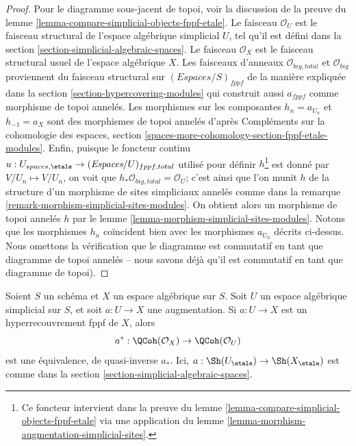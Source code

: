 \begin{proof}
Pour le diagramme sous-jacent de topoi, voir la discussion de
la preuve du lemme \ref{lemma-compare-simplicial-objects-fppf-etale}.
Le faisceau $\mathcal{O}_U$ est le faisceau structural de l'espace algébrique simplicial
$U$, tel qu'il est défini dans la section
\ref{section-simplicial-algebraic-spaces}.
Le faisceau $\mathcal{O}_X$ est le faisceau structural usuel de l'espace algébrique
$X$. Les faisceaux d'anneaux $\mathcal{O}_{big, total}$ et
$\mathcal{O}_{big}$ proviennent du faisceau structural sur
$(\textit{Espaces}/S)_{fppf}$ de la manière expliquée dans la section
\ref{section-hypercovering-modules}
qui construit aussi $a_{fppf}$ comme morphisme de topoi annelés.
Les morphismes sur les composantes $h_n = a_{U_n}$ et $h_{-1} = a_X$
sont des morphismes de topoi annelés d'après
Compléments sur la cohomologie des espaces, section
\ref{spaces-more-cohomology-section-fppf-etale-modules}.
Enfin, puisque le foncteur continu
$u : U_{spaces, \etale} \to (\textit{Espaces}/U)_{fppf, total}$
utilisé pour définir $h$\footnote{Ce foncteur intervient dans la preuve du
lemme \ref{lemma-compare-simplicial-objects-fppf-etale}
via une application du lemme
\ref{lemma-morphism-augmentation-simplicial-sites}.}
est donné par $V/U_n \mapsto V/U_n$,
on voit que $h_*\mathcal{O}_{big, total} = \mathcal{O}_U$;
c'est ainsi que l'on munit $h$ de la structure d'un morphisme
de sites simpliciaux annelés comme dans
la remarque \ref{remark-morphism-simplicial-sites-modules}.
On obtient alors un morphisme de topoi annelés $h$
par le lemme \ref{lemma-morphism-simplicial-sites-modules}.
Notons que les morphismes $h_n$ coïncident bien
avec les morphismes $a_{U_n}$ décrits ci-dessus.
Nous omettons la vérification
que le diagramme est commutatif en tant que diagramme de topoi annelés
-- nous savons déjà qu'il est commutatif
en tant que diagramme de topoi).
\end{proof}

\begin{lemma}
\label{lemma-descent-qcoh-for-fppf-hypercovering}
Soient $S$ un schéma et $X$ un espace algébrique sur $S$.
Soit $U$ un espace algébrique simplicial sur $S$, et soit $a : U \to X$
une augmentation. Si $a : U \to X$ est un hyperrecouvrement fppf de $X$,
alors
$$
a^* : \QCoh(\mathcal{O}_X) \to \QCoh(\mathcal{O}_U)
$$
est une équivalence, de quasi-inverse $a_*$.
Ici, $a : \Sh(U_\etale) \to \Sh(X_\etale)$
est comme dans la section \ref{section-simplicial-algebraic-spaces}.
\end{lemma}

